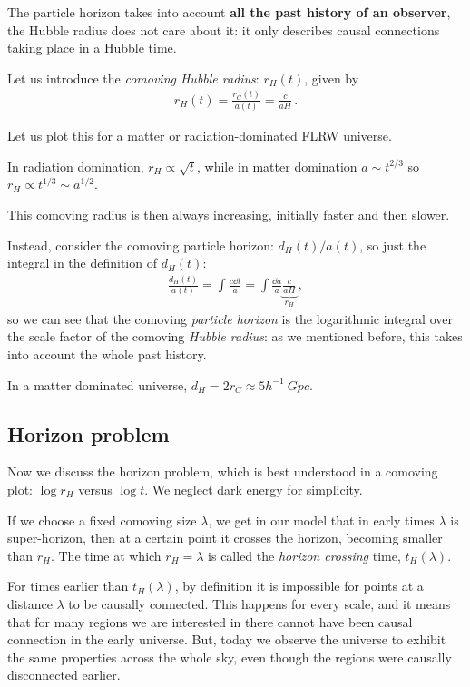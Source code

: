 \documentclass[main.tex]{subfiles}
\begin{document}
The particle horizon takes into account \textbf{all the past history of an observer}, the Hubble radius does not care about it: it only describes causal connections taking place in a Hubble time. 

Let us introduce the \emph{comoving Hubble radius}: \(r_H (t)\), given by 
%
\begin{align}
r_H (t) = \frac{r_C (t)}{a(t)} = \frac{c}{a H}
\,.
\end{align}

Let us plot this for a matter or radiation-dominated FLRW universe.

In radiation domination, \(r_H \propto \sqrt{t}\), while in matter domination \(a \sim t^{2/3}\) so \(r_H \propto t^{1/3} \sim a^{1/2}\). 

This comoving radius is then always increasing, initially faster and then slower. 

Instead, consider the comoving particle horizon: \(d_H (t) / a(t)\), so just the integral in the definition of \(d_H(t)\): 
%
\begin{align}
\frac{d_H (t)}{a(t)} = \int \frac{c \dd{t}}{a} = \int \frac{ \dd{a}}{a} \underbrace{\frac{c}{a H}}_{r_H}
\,,
\end{align}
%
so we can see that the comoving \emph{particle horizon} is the logarithmic integral over the scale factor of the comoving \emph{Hubble radius}: as we mentioned before, this takes into account the whole past history. 

In a matter dominated universe, \(d_H = 2 r_C \approx 5 h^{-1} \SI{}{Gpc}\).

\subsection{Horizon problem}

Now we discuss the horizon problem, which is best understood in a comoving plot: \(\log r_H \) versus \(\log t\). We neglect dark energy for simplicity.

If we choose a fixed comoving size \(\lambda \), we get in our model that in early times \(\lambda \) is super-horizon, then at a certain point it crosses the horizon, becoming smaller than \(r_H \). The time at which \(r_H = \lambda \) is called the \emph{horizon crossing} time, \(t_H (\lambda )\). 

For times earlier than \(t_H (\lambda )\), by definition it is impossible for points at a distance \(\lambda \) to be causally connected. 
This happens for every scale, and it means that for many regions we are interested in there cannot have been causal connection in the early universe. 
But, today we observe the universe to exhibit the same properties across the whole sky, even though the regions were causally disconnected earlier. 
\end{document}
